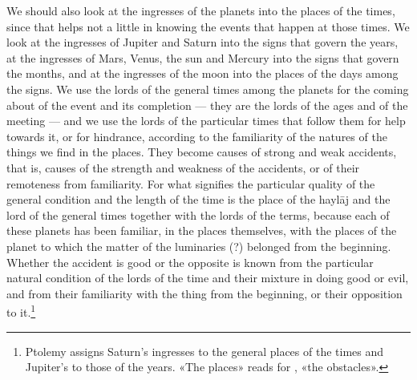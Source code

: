 \documentclass[11pt]{article}
\newcommand{\Fol}[1]{\marginpar{\footnotesize\color{gray}f.\,#1}}
\begin{document}
\par \Fol{78v}We should also look at the ingresses of the planets into the places of the times, since that helps not a little in knowing the events that happen at those times. We look at the ingresses of Jupiter and Saturn into the signs that govern the years, at the ingresses of Mars, Venus, the sun and Mercury into the signs that govern the months, and at the ingresses of the moon into the places of the days among the signs. We use the lords of the general times among the planets for the coming about of the event and its completion — they are the lords of the ages and of the meeting — and we use the lords of the particular times that follow them for help towards it, or for hindrance, according to the familiarity of the natures of the things we find in the places. They become causes of strong and weak accidents, that is, causes of the strength and weakness of the accidents, or of their remoteness from familiarity. For what signifies the particular quality of the general condition and the length of the time is the place of the haylāj and the lord of the general times together with the lords of the terms, because each of these planets has been familiar, in the places themselves, with the places of the planet to which the matter of the luminaries (?) belonged from the beginning. Whether the accident is good or the opposite is known from the particular natural condition of the lords of the time and their mixture in doing good or evil, and from their familiarity with the thing from the beginning, or their opposition to it.\footnote{Ptolemy assigns Saturn's ingresses to the general places of the times and Jupiter's to those of the years. «The places» reads  for , «the obstacles».}\par
\end{document}
